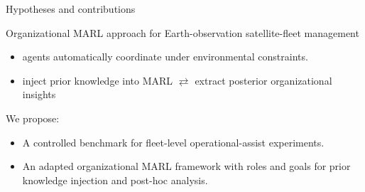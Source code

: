 \documentclass[aspectratio=169]{beamer}
\begin{document}
\begin{frame}{Hypotheses and contributions}

  \begin{tcolorbox}[
      colback=white,
      colframe=blue!60!black,
      boxrule=0.8pt,
      arc=1mm,
      left=2mm,
      right=2mm,
      top=1mm,
      bottom=1mm
    ]

    Organizational MARL approach for Earth-observation satellite-fleet management
    \begin{itemize}
      \item agents automatically coordinate under environmental constraints.
      \item inject prior knowledge into MARL $\rightleftarrows$ extract posterior organizational insights
    \end{itemize}

  \end{tcolorbox}


  \vspace{1cm}

  We propose:
  \begin{itemize}
    \item A controlled benchmark for fleet-level operational-assist experiments.
    \item An adapted organizational MARL framework with roles and goals for prior knowledge injection and post-hoc analysis.
  \end{itemize}

\end{frame}
\end{document}
